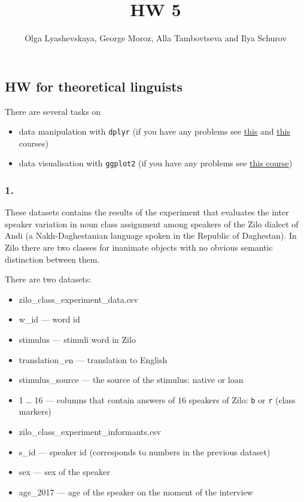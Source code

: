\documentclass[]{article}
\title{HW 5}
\author{Olga Lyashevskaya, George Moroz, Alla Tambovtseva and Ilya Schurov}
\date{}
\providecommand{\tightlist}{%
  \setlength{\itemsep}{0pt}\setlength{\parskip}{0pt}}
\begin{document}
\maketitle

\subsection{HW for theoretical
linguists}\label{hw-for-theoretical-linguists}

There are several tasks on

\begin{itemize}
\tightlist
\item
  data manipulation with \texttt{dplyr} (if you have any problems see
  \href{https://www.datacamp.com/courses/dplyr-data-manipulation-r-tutorial}{this}
  and
  \href{https://www.datacamp.com/courses/joining-data-in-r-with-dplyr}{this}
  courses)
\item
  data visualisation with \texttt{ggplot2} (if you have any problems see
  \href{https://www.datacamp.com/courses/data-visualization-with-ggplot2-1}{this
  course})
\end{itemize}

\subsubsection{1.}\label{section}

These datasets contains the results of the experiment that evaluates the
inter speaker variation in noun class assignment among speakers of the
Zilo dialect of Andi (a Nakh-Daghestanian language spoken in the
Republic of Daghestan). In Zilo there are two classes for inanimate
objects with no obvious semantic distinction between them.

There are two datasets:

\begin{itemize}
\tightlist
\item
  zilo\_class\_experiment\_data.csv
\item
  w\_id --- word id
\item
  stimulus --- stimuli word in Zilo
\item
  translation\_en --- translation to English
\item
  stimulus\_source --- the source of the stimulus: native or loan
\item
  1 \ldots{} 16 --- columns that contain answers of 16 speakers of Zilo:
  \texttt{b} or \texttt{r} (class markers)
\item
  zilo\_class\_experiment\_informants.csv
\item
  s\_id --- speaker id (corresponds to numbers in the previous dataset)
\item
  sex --- sex of the speaker
\item
  age\_2017 --- age of the speaker on the moment of the interview
\end{itemize}
\end{document}
